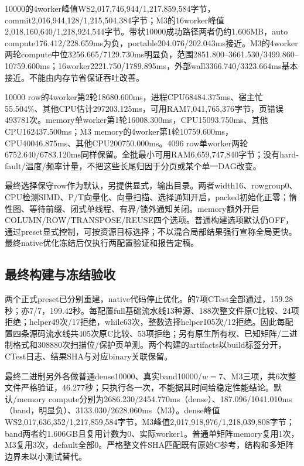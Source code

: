 \documentclass[UTF8,a4paper,11pt]{ctexart}
\begin{document}
10000的4worker峰值WS2,017,746,944/\allowbreak{}1,217,859,584字节，commit2,016,944,128/\allowbreak{}1,215,504,384字节；M3的16worker峰值2,018,160,640/\allowbreak{}1,218,924,544字节。带状10000成功路径两者仍约1,606MB，auto compute176.412/\allowbreak{}228.659ms为负，portable204.076/\allowbreak{}202.043ms接近。M3的4worker两轮compute中位3256.665/\allowbreak{}7129.730ms明显负，范围2851.800--3661.530/\allowbreak{}3499.860--10759.600ms；16worker2221.750/\allowbreak{}1789.895ms，外部wall3366.740/\allowbreak{}3323.664ms基本接近。不能由内存节省保证吞吐改善。

10000 row的4worker第2轮18680.600ms，进程CPU68484.375ms、宿主忙55.504\%、其他CPU估计297203.125ms，可用RAM7,041,765,376字节，页错误493781次。memory单worker第1轮16008.300ms，CPU15093.750ms、其他CPU162437.500ms；M3 memory的4worker第1轮10759.600ms，CPU40046.875ms、其他CPU200750.000ms。4096 row单worker两轮6752.640/6783.120ms同样保留。全批最小可用RAM6,659,747,840字节；没有hard-fault/温度/频率计量，不把这些长尾归因于分页或某个单一DAG改变。

最终选择保守row作为默认，另提供显式，输出目录。两者width16、rowgroup0、CPU检测SIMD、P/T向量化、向量扫描、选择通知开启，packed初始化正零；惰性图、等待前缀、闭式单线程、有界/锁外通知关闭。memory额外开启COLUMN/ROW/TRANSPOSE/REUSE四个选项。普通构建选项默认仍OFF，通过preset显式控制，可按资源目标选择；不以混合局部结果强行宣称全局更快。最终native优化冻结后仅执行两配置验证和报告定稿。

\subsection{最终构建与冻结验收}
两个正式preset已分别重建，native代码停止优化。的7项CTest全部通过，159.28秒；亦7/7，199.42秒。每配置full基础流水线13种源、188次整文件原C比较、24项拒绝；helper49次/17拒绝，while63次，整数选择helper105次/12拒绝。因此每配置四条源码流水线共405次原C比较、53项拒绝；另有原生所有权、已知矩阵/二进制格式和308880次扫描位/保护页单测。两个构建的artifacts以build标签分开，CTest日志、结果SHA与对应binary关联保留。

最终二进制另外各做普通dense10000、真实band10000/$w=7$、M3三项，共6次整文件严格验证，46.277秒；只执行各一次，不能据其时间给稳定性能结论。默认/memory compute分别为2686.230/2454.770ms（dense）、187.096/1041.010ms（band，明显负）、3133.030/2628.060ms（M3）。dense峰值WS2,017,636,352/1,217,859,584字节，M3峰值2,017,918,976/1,218,039,808字节；band两者约1.606GB且复用计数为0、实际worker1。普通单矩阵memory复用1次，M3复用3次，default全部0。严格整文件SHA匹配既有原始C参考，结构和多矩阵边界未以小测试替代。
\end{document}
